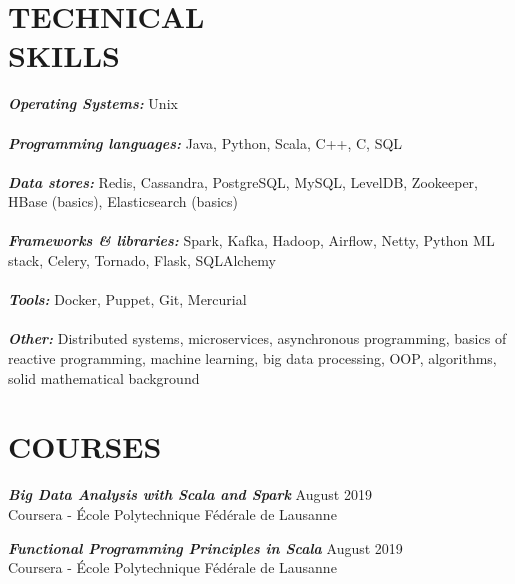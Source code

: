\documentclass[margin, 10pt]{res} %
\begin{document}
\begin{resume}

\section{TECHNICAL \\ SKILLS} 

{\sl \bf Operating Systems:} Unix \\ \\
{\sl \bf Programming languages:}
Java, Python, Scala, C++, C, SQL \\ \\ 
{\sl \bf Data stores:} Redis, Cassandra, PostgreSQL, MySQL, LevelDB, Zookeeper, HBase (basics), Elasticsearch (basics) \\ \\
{\sl \bf Frameworks \& libraries:} Spark, Kafka, Hadoop, Airflow, Netty, Python ML stack, Celery, Tornado, Flask, SQLAlchemy \\ \\
{\sl \bf Tools:} Docker, Puppet, Git, Mercurial \\ \\
{\sl \bf Other:} Distributed systems, microservices, asynchronous programming, basics of reactive programming, machine learning, big data processing, OOP, algorithms, solid mathematical background

 
\section{COURSES}

{\sl \bf Big Data Analysis with Scala and Spark} \hfill  August 2019 \\
Coursera - École Polytechnique Fédérale de Lausanne

{\sl \bf Functional Programming Principles in Scala} \hfill  August 2019 \\
Coursera - École Polytechnique Fédérale de Lausanne



\end{resume}
\end{document}
